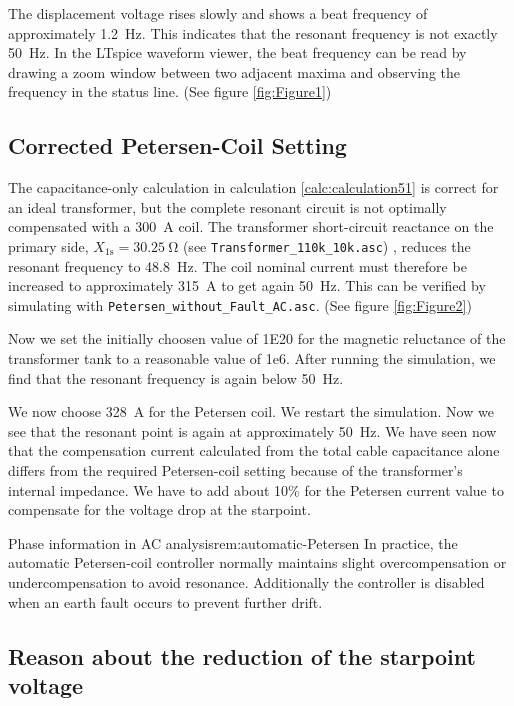 The displacement voltage rises slowly and shows a beat frequency of
approximately \SI{1.2}{\hertz}. This indicates that the resonant frequency is
not exactly \SI{50}{\hertz}. In the LTspice waveform viewer, the beat frequency
can be read by drawing a zoom window between two adjacent maxima and observing
the frequency in the status line. (See figure \ref{fig:Figure1})
 

\subsection{Corrected Petersen-Coil Setting}
\label{sec:Corrected Petersen-Coil Setting}

The capacitance-only calculation in calculation \ref{calc:calculation51} is correct for
an ideal transformer, but the complete resonant circuit is not optimally compensated
with a \SI{300}{\ampere} coil. The transformer short-circuit reactance on the primary side,
$X_{\mathrm{1s}}=\SI{30.25}{\ohm}$ (see \texttt{Transformer\_110k\_10k.asc}) , reduces the
resonant frequency to \SI{48.8}{\hertz}. The coil nominal current must
therefore be increased to approximately \SI{315}{\ampere} to get again \SI{50}{\hertz}. This can be verified by simulating with \texttt{Petersen\_without\_Fault\_AC.asc}. (See figure \ref{fig:Figure2})

Now we set the initially choosen value of
1E20 for the magnetic reluctance of the transformer tank to a reasonable value of 1e6. After running the simulation, we find that the resonant frequency is again below \SI{50}{\hertz}. 

We now choose \SI{328}{\ampere} for the Petersen coil. We restart the simulation. Now we see that the resonant point is again at approximately \SI{50}{\hertz}. We have seen now that the compensation current calculated from the total cable capacitance alone differs from the required Petersen-coil setting because of the transformer’s internal impedance. We have to add about 10\% for the Petersen current value to compensate for the voltage drop at the starpoint.

\begin{remark}{Phase information in AC analysis}{rem:automatic-Petersen}
	In practice, the automatic Petersen-coil controller normally maintains slight overcompensation or undercompensation to avoid resonance. Additionally the controller is disabled when an earth fault occurs to prevent further drift.
\end{remark}

\subsection{Reason about the reduction of the starpoint voltage}
 
